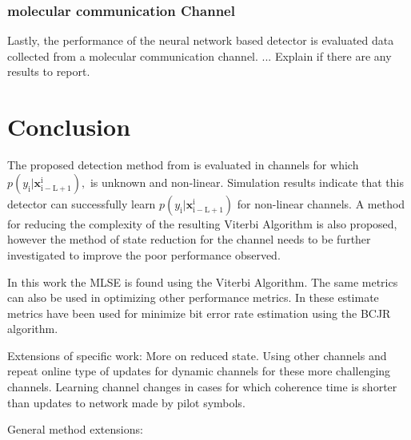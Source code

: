 \documentclass[12pt,a4paper]{report}
\begin{document}
\subsubsection{molecular communication Channel}
Lastly, the performance of the neural network based detector is evaluated data collected from a molecular communication channel. ... Explain if there are any results to report. 

\section{Conclusion}
The proposed detection method from \cite{shlezinger2019viterbinet} is evaluated in channels for which $p(y_{\mathrm{i}}|\mathbf{x}_{\mathrm{i-L+1}}^{\mathrm{i}}),$ is unknown and non-linear. Simulation results indicate that this detector can successfully learn
$p(y_{\mathrm{i}}|\mathbf{x}_{\mathrm{i-L+1}}^{\mathrm{i}})$ for non-linear channels. A method for reducing the complexity of the resulting Viterbi Algorithm is also proposed, however the method of state reduction for the channel needs to be further investigated to improve the poor performance observed. 
\par 
In this work the MLSE is found using the Viterbi Algorithm. The same metrics can also be used in optimizing other performance metrics. In \cite{shlezinger2020datadriven} these estimate metrics have been used for minimize bit error rate estimation using the BCJR algorithm. 

Extensions of specific work: 
More on reduced state.
Using other channels and repeat online type of updates for dynamic channels for these more challenging channels. 
Learning channel changes in cases for which coherence time is shorter than updates to network made by pilot symbols. 

General method extensions:


\newpage
{}
%
\end{document}
